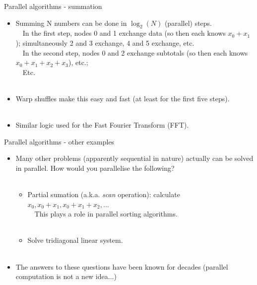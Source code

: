 \documentclass[usenames,dvipsnames]{beamer}
\begin{document}
\begin{frame}{Parallel algorithms - summation}
  \begin{block}{}
    \begin{itemize}
      \item{Summing N numbers can be done in $\log_2(N)$ (parallel) steps.\\~\
      In the first step, nodes 0 and 1 exchange data (so then each knows $x_0 + x_1$); simultaneously 2 and 3 exchange, 4 and 5 exchange, etc.\\~\
      In the second step, nodes 0 and 2 exchange subtotals (so then each knows $x_0 + x_1 + x_2 + x_3$), etc.;\\~\
      Etc.}\\~\
      \item{Warp shuffles make this easy and fast (at least for the first five steps).}\\~\
      \item{Similar logic used for the Fast Fourier Transform (FFT).}
    \end{itemize}
  \end{block}
\end{frame}

\begin{frame}{Parallel algorithms - other examples}
  \begin{block}{}
    \begin{itemize}
      \item{Many other problems (apparently sequential in nature) actually can be solved in parallel. How would you parallelise the following?}\\~\
      \begin{itemize}
        \item{Partial sumation (a.k.a. \textit{scan} operation): calculate $x_0, x_0+x_1, x_0+x_1+x_2, \ldots$\\~\ This plays a role in parallel sorting algorithms.}\\~\
        \item{Solve tridiagonal linear system.}\\~\
      \end{itemize}
      \item{The answers to these questions have been known for decades (parallel computation is not a new idea...)}
    \end{itemize}
  \end{block}
\end{frame}
\end{document}
